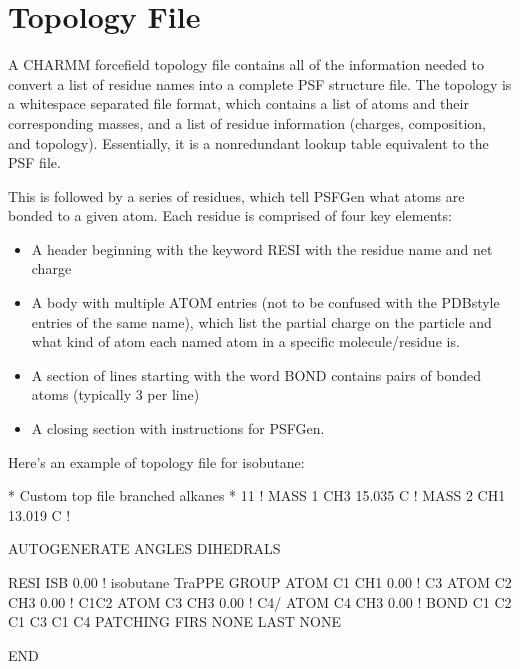\documentclass[letterpaper,10pt,english]{sphinxmanual}
\begin{document}
\section{Topology File}
\label{\detokenize{input_file:topology-file}}
\sphinxAtStartPar
A CHARMM forcefield topology file contains all of the information needed to convert a list of residue names into a complete PSF structure file. The topology is a whitespace separated file format, which contains a list of atoms and their corresponding masses, and a list of residue information (charges, composition, and topology). Essentially, it is a non\sphinxhyphen{}redundant lookup table equivalent to the PSF file.

\sphinxAtStartPar
This is followed by a series of residues, which tell PSFGen what atoms are bonded to a given atom. Each residue is comprised of four key elements:
\begin{itemize}
\item {} 
\sphinxAtStartPar
A header beginning with the keyword RESI with the residue name and net charge

\item {} 
\sphinxAtStartPar
A body with multiple ATOM entries (not to be confused with the PDB\sphinxhyphen{}style entries of the same name), which list the partial charge on the particle and what kind of atom each named atom in a specific molecule/residue is.

\item {} 
\sphinxAtStartPar
A section of lines starting with the word BOND contains pairs of bonded atoms (typically 3 per line)

\item {} 
\sphinxAtStartPar
A closing section with instructions for PSFGen.

\end{itemize}

\sphinxAtStartPar
Here’s an example of topology file for isobutane:

\begin{sphinxVerbatim}[commandchars=\\\{\}]
* Custom top file \PYGZhy{}\PYGZhy{} branched alkanes *
11
!
MASS 1 CH3 15.035 C !
MASS 2 CH1 13.019 C !

AUTOGENERATE ANGLES DIHEDRALS

RESI ISB    0.00 !  isobutane \PYGZhy{} TraPPE
GROUP
ATOM  C1  CH1   0.00 !  C3\PYGZbs{}
ATOM  C2  CH3   0.00 !     C1\PYGZhy{}C2
ATOM  C3  CH3   0.00 !  C4/
ATOM  C4  CH3   0.00 !
BOND  C1  C2  C1  C3  C1  C4
PATCHING FIRS NONE LAST NONE

END
\end{sphinxVerbatim}
\end{document}

